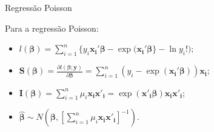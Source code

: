 \documentclass[10pt, aspectratio=169]{beamer}
\begin{document}





\begin{frame}{Regressão Poisson} 

Para a regressão Poisson:

\vspace{0.5cm}

\begin{itemize} 

\item $l(\boldsymbol{\beta})=\sum_{i=1}^{n} \{ y_{i}\boldsymbol{x_{i}'\beta}-\exp{(\boldsymbol{x_{i}'\beta}}\}-\ln{y_{i}!});$

\vspace{0.5cm}

\item $\boldsymbol{S}(\boldsymbol{\beta})=\frac{\partial l(\boldsymbol{\beta};\boldsymbol{y})}{\partial \boldsymbol{\beta}}=
              \sum_{i=1}^{n}(y_{i}-\exp(\boldsymbol{x_{i}'\beta}))\boldsymbol{x_{i}};$       
\vspace{0.5cm}
  
\item $
\boldsymbol{I({\beta})} = \sum_{i=1}^n \mu_i \boldsymbol{x_i x'_i}  = \exp{(\boldsymbol{x'_i \beta})\boldsymbol{x_i x'_i}}; 
$
  
\vspace{0.5cm}
  
\item  $
\boldsymbol{\hat{\beta}} \sim N \left ( \boldsymbol{\beta}, \left [ \sum_{i=1}^n \mu_i \boldsymbol{x_i x'_i} \right ]^{-1} \right ). 
$ 
       
\end{itemize}

\end{frame}




\end{document}

